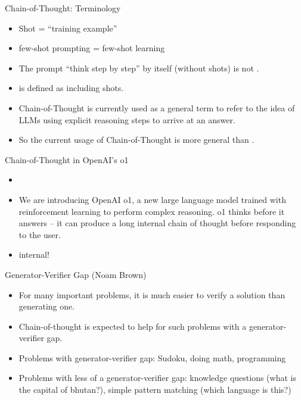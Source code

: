 \begin{frame}{Chain-of-Thought: Terminology}

\vfill

\begin{itemize}
    \item Shot = ``training example''
    \item few-shot prompting = few-shot learning
    \item The prompt ``think step by step'' by itself
    (without shots) is not \cotpfull.
    \item \cotpfull is defined as including shots.
    \item Chain-of-Thought is currently used as a general
    term to refer to the idea of LLMs using explicit
    reasoning steps to arrive at an answer.
    \item So the current usage of Chain-of-Thought is more
    general than \cotpfull.
\end{itemize}

\vfill

\end{frame}
\begin{frame}{Chain-of-Thought in OpenAI's o1}

\vfill

\begin{itemize}
    \item {}
\item We are introducing OpenAI o1, a new large language
model trained with reinforcement learning to perform complex
reasoning. o1 thinks before it answers -- it can produce a long
internal chain of thought before responding to the user.
\item internal!
\end{itemize}

\vfill

\end{frame}

\begin{frame}{Generator-Verifier Gap (Noam Brown)}

\vfill

\begin{itemize}
    \item For many important problems, it is much easier to
    verify a solution than generating one.
    \item Chain-of-thought is expected to help for such
    problems with a generator-verifier gap.
    \item Problems with generator-verifier gap: Sudoku,
    doing math, programming
    \item Problems with less of a generator-verifier gap:
    knowledge questions (what is the capital of bhutan?),
    simple pattern matching (which language is this?)
    
\end{itemize}

\vfill

\end{frame}

